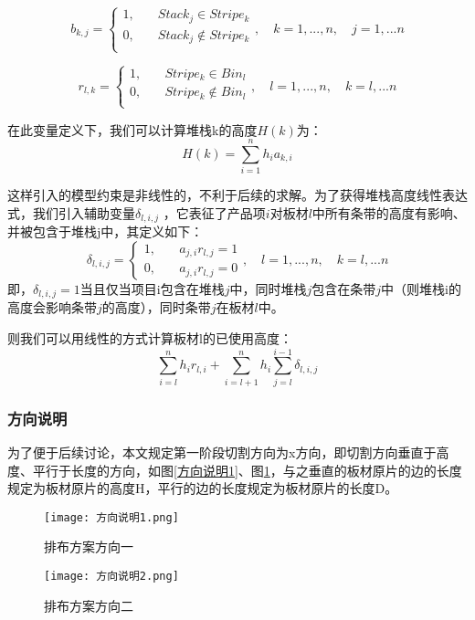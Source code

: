 \documentclass[bwprint]{gmcmthesis}
\begin{document}
\begin{equation}
    b_{k,j}=
    \begin{cases}
        1, \quad  & Stack_j \in  Stripe_k \\
        0,\quad  & Stack_j  \notin  Stripe_k \\
    \end{cases},\quad k=1,...,n, \quad j=1,...n
\end{equation}

\begin{equation}
    r_{l,k}=
    \begin{cases}
        1, \quad  & Stripe_k \in  Bin_l \\
        0,\quad  & Stripe_k  \notin  Bin_l \\
    \end{cases},\quad l=1,...,n, \quad k=l,...n
\end{equation}

在此变量定义下，我们可以计算堆栈k的高度$H(k)$为：
\begin{equation}
    H(k)=\sum_{i=1}^{n} h_i a_{k,i}
\end{equation}


这样引入的模型约束是非线性的，不利于后续的求解。为了获得堆栈高度线性表达式，我们引入辅助变量$\delta_{l,i,j}$ ，它表征了产品项$i$对板材$l$中所有条带的高度有影响、并被包含于堆栈j中，其定义如下：
\begin{equation}
    \delta_{l,i,j}=  
    \begin{cases}
        1, \quad  & a_{j,i} r_{l,j}=1\\
        0, \quad  & a_{j,i} r_{l,j}=0
    \end{cases},\quad l=1,...,n, \quad k=l,...n
\end{equation}
即，$\delta_{l,i,j} = 1$当且仅当项目i包含在堆栈$j$中，同时堆栈$j$包含在条带$j$中（则堆栈i的高度会影响条带$j$的高度），同时条带$j$在板材$l$中。

则我们可以用线性的方式计算板材l的已使用高度：
\begin{equation}
\sum_{i=l}^{n} h_i r_{l,i}+\sum_{i=l+1}^{n} h_i \sum_{j=l}^{i-1} \delta_{l,i,j}
\end{equation}

\subsubsection{方向说明}
为了便于后续讨论，本文规定第一阶段切割方向为x方向，即切割方向垂直于高度、平行于长度的方向，如图\ref{方向说明1}、图\ref{方向说明2}，与之垂直的板材原片的边的长度规定为板材原片的高度H，平行的边的长度规定为板材原片的长度D。
\begin{figure}[!htbp]
    \centering
    \begin{minipage}{0.48\linewidth}
        \centering
        \texttt{[image: 方向说明1.png]}
        \caption{排布方案方向一}\label{方向说明1}
    \end{minipage}
    \begin{minipage}{0.48\linewidth}
        \centering
        \texttt{[image: 方向说明2.png]}
        \caption{排布方案方向二}\label{方向说明2}
    \end{minipage}
\end{figure}
\end{document}
